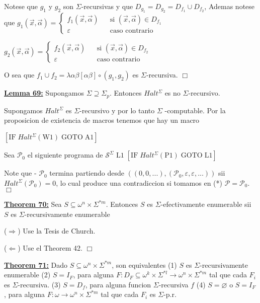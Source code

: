 Notese que \(g_{1}\) y \(g_{2}\) son \(\Sigma \)-recursivas y que \( D_{g_{1}}=D_{g_{2}}=D_{f_{1}}\cup D_{f_{2}}\), Ademas notese que
\(\displaystyle g_{1}(\vec{x},\vec{\alpha})=\left\{ \begin{array}{lll} f_{1}(\vec{x},\vec{\alpha}) & & \text{si }(\vec{x},\vec{\alpha})\in D_{f_{1}} \\ \varepsilon & & \text{caso contrario} \end{array} \right. \)

\(\displaystyle g_{2}(\vec{x},\vec{\alpha})=\left\{ \begin{array}{lll} f_{2}(\vec{x},\vec{\alpha}) & & \text{si }(\vec{x},\vec{\alpha})\in D_{f_{2}} \\ \varepsilon & & \text{caso contrario} \end{array} \right. \)

O sea que \(f_{1}\cup f_{2}=\lambda \alpha \beta \left[ \alpha \beta \right] \circ (g_{1},g_{2})\) es \(\Sigma \)-recursiva. \(\Box\)


\textbf{\underline{Lemma 69:}} Supongamos \(\Sigma \supseteq \Sigma _{p}\). Entonces \( Halt^{\Sigma }\) es no \(\Sigma \)-recursivo.

\PROOF Supongamos \(Halt^{\Sigma }\) es \(\Sigma \)-recursivo y por lo tanto \(\Sigma \) -computable. Por la proposicion de existencia de macros tenemos que hay un macro

\(\displaystyle \left[ \mathrm{IF}\;Halt^{\Sigma }(\mathrm{W}1)\;\mathrm{GOTO}\;\mathrm{A}1 \right] \)

Sea \(\mathcal{P}_{0}\) el siguiente programa de \(\mathcal{S}^{\Sigma }\)
\(\displaystyle \mathrm{L}1\;\left[ \mathrm{IF}\;Halt^{\Sigma }(\mathrm{P}1)\;\mathrm{GOTO}\; \mathrm{L}1\right] \)

Note que
- \(\mathcal{P}_{0}\) termina partiendo desde \(\left( (0,0,...),( \mathcal{P}_{0},\varepsilon ,\varepsilon ,...)\right) \) sii \(Halt^{\Sigma }( \mathcal{P}_{0})=0\),
lo cual produce una contradiccion si tomamos en (*) \(\mathcal{P}= \mathcal{P}_{0}\). \(\Box\)


\textbf{\underline{Theorem 70:}} Sea \(S\subseteq \omega ^{n}\times \Sigma ^{\ast m}\). Entonces \(S\) es \(\Sigma \)-efectivamente enumerable sii \(S\) es \(\Sigma \)-recursivamente enumerable


\PROOF (\(\Rightarrow \)) Use la Tesis de Church.

(\(\Leftarrow \)) Use el Theorem 42. \(\Box\)



\textbf{\underline{Theorem 71:}} Dado \(S\subseteq \omega ^{n}\times \Sigma ^{\ast m} \), son equivalentes
(1) \(S\) es \(\Sigma \)-recursivamente enumerable
(2) \(S=I_{F}\), para alguna \(F:D_{F}\subseteq \omega ^{k}\times \Sigma ^{\ast l}\rightarrow \omega ^{n}\times \Sigma ^{\ast m}\) tal que cada \(F_{i}\) es \(\Sigma \)-recursiva.
(3) \(S=D_{f}\), para alguna funcion \(\Sigma \)-recursiva \(f\)
(4) \(S=\varnothing \) o \(S=I_{F}\), para alguna \(F:\omega \rightarrow \omega ^{n}\times \Sigma ^{\ast m}\) tal que cada \(F_{i}\) es \(\Sigma \)-p.r.


